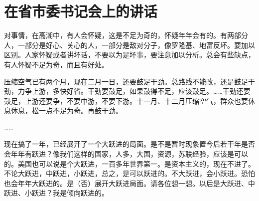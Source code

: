 \section[在省市委书记会上的讲话（一九五九年二月二日）]{在省市委书记会上的讲话}


对事情，在高潮中，有人会怀疑，这是不足为奇的，怀疑年年会有的。有两部分人，一部分是好心、关心的人，一部分是敌对分子，像罗隆基、地富反坏。要加以区别。人家怀疑或者讲坏话，不要以为是坏事，要注意加以分析。总会有些缺点，有人怀疑不足为奇，而且有好处。

压缩空气已有两个月，现在二月一日，还要鼓足干劲。总路线不能改，还是鼓足干劲，力争上游，多快好省。干劲要鼓足，如果鼓得不足，应该鼓足。……干劲还要鼓足，上游还要争，不要中游，不要下游。十一月、十二月压缩空气，群众也要休息休息，松一点不足为奇。再鼓干劲。

……

现在搞了一年，已经展开了一个大跃进的局面。是不是暂时现象置今后若干年是否会年年有跃进？像我们这样的国家，人多，大国，资源，苏联经验，应该是可以的。美国也可以说是个大跃进，一百多年世界第一。是资本主义的，现在不进了。不论大跃进，中跃进，小跃进，总之，是可以跃进的。不大跃进，会小跃进。恐怕也会年年大跃进的。是（否）展开大跃进局面。请各位想一想。以后是大跃进、中跃进、小跃进？我是倾向跃进的。

